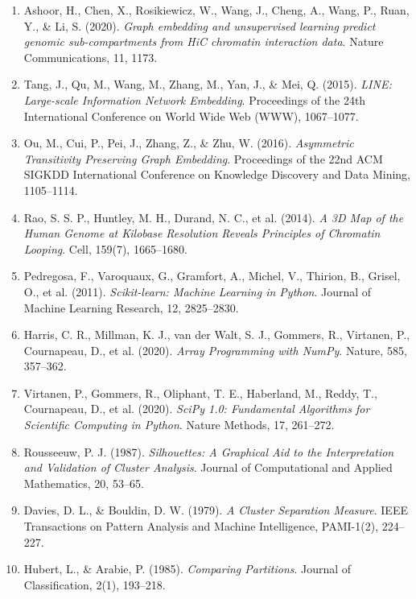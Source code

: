 \documentclass[12pt]{article}
\begin{document}
\begin{enumerate}
    \item Ashoor, H., Chen, X., Rosikiewicz, W., Wang, J., Cheng, A., Wang, P., Ruan, Y., \& Li, S.
    (2020). \textit{Graph embedding and unsupervised learning predict genomic sub-compartments
    from HiC chromatin interaction data}. Nature Communications, 11, 1173.

    \item Tang, J., Qu, M., Wang, M., Zhang, M., Yan, J., \& Mei, Q. (2015). \textit{LINE:
    Large-scale Information Network Embedding}. Proceedings of the 24th International
    Conference on World Wide Web (WWW), 1067--1077.

    \item Ou, M., Cui, P., Pei, J., Zhang, Z., \& Zhu, W. (2016). \textit{Asymmetric Transitivity
    Preserving Graph Embedding}. Proceedings of the 22nd ACM SIGKDD International
    Conference on Knowledge Discovery and Data Mining, 1105--1114.

    \item Rao, S. S. P., Huntley, M. H., Durand, N. C., et al. (2014). \textit{A 3D Map of the
    Human Genome at Kilobase Resolution Reveals Principles of Chromatin Looping}. Cell,
    159(7), 1665--1680.

    \item Pedregosa, F., Varoquaux, G., Gramfort, A., Michel, V., Thirion, B., Grisel, O., et al.
    (2011). \textit{Scikit-learn: Machine Learning in Python}. Journal of Machine Learning
    Research, 12, 2825--2830.

    \item Harris, C. R., Millman, K. J., van der Walt, S. J., Gommers, R., Virtanen, P.,
    Cournapeau, D., et al. (2020). \textit{Array Programming with NumPy}. Nature, 585,
    357--362.

    \item Virtanen, P., Gommers, R., Oliphant, T. E., Haberland, M., Reddy, T., Cournapeau, D.,
    et al. (2020). \textit{SciPy 1.0: Fundamental Algorithms for Scientific Computing in
    Python}. Nature Methods, 17, 261--272.

    \item Rousseeuw, P. J. (1987). \textit{Silhouettes: A Graphical Aid to the Interpretation
    and Validation of Cluster Analysis}. Journal of Computational and Applied Mathematics,
    20, 53--65.

    \item Davies, D. L., \& Bouldin, D. W. (1979). \textit{A Cluster Separation Measure}.
    IEEE Transactions on Pattern Analysis and Machine Intelligence, PAMI-1(2), 224--227.

    \item Hubert, L., \& Arabie, P. (1985). \textit{Comparing Partitions}. Journal of
    Classification, 2(1), 193--218.
\end{enumerate}
\end{document}
